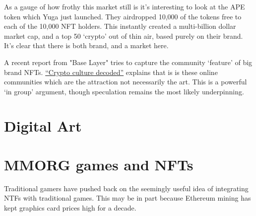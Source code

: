 As a gauge of how frothy this market still is it's interesting to look at the APE token which Yuga just launched. They airdropped 10,000 of the tokens free to each of the 10,000 NFT holders. This instantly created a multi-billion dollar market cap, and a top 50 `crypto' out of thin air, based purely on their brand. It's clear that there is both brand, and a market here.\par
A recent report from "Base Layer" tries to capture the community `feature' of big brand NFTs. \href{https://baselayer.so/crypto-culture-decoded}{``Crypto culture decoded''} explains that is is these online communities which are the attraction not necessarily the art. This is a powerful `in group' argument, though speculation remains the most likely underpinning.




\section{Digital Art}


\section{MMORG games and NFTs}
Traditional gamers have pushed back on the seemingly useful idea of integrating NTFs with traditional games. This may be in part because Ethereum mining has kept graphics card prices high for a decade.

